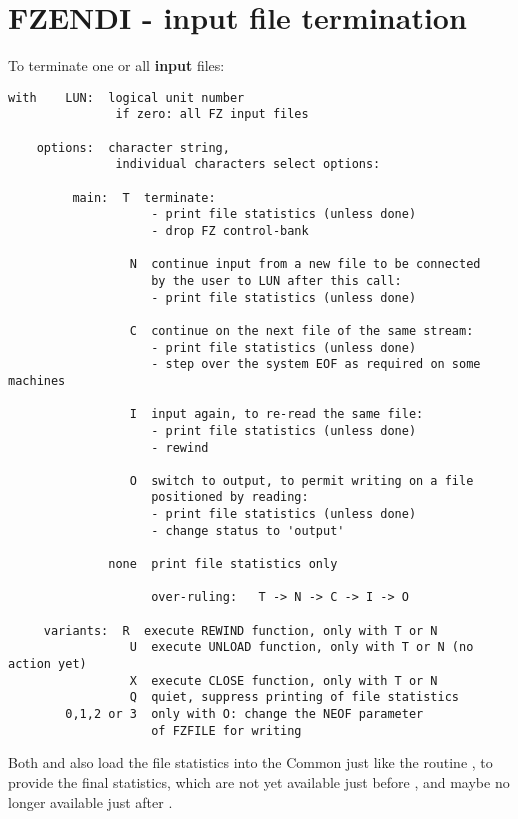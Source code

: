 \section{FZENDI - input file termination}

To terminate one or all \textbf{input} files:


\begin{verbatim}
with    LUN:  logical unit number
               if zero: all FZ input files

    options:  character string,
               individual characters select options:

         main:  T  terminate:
                    - print file statistics (unless done)
                    - drop FZ control-bank

                 N  continue input from a new file to be connected
                    by the user to LUN after this call:
                    - print file statistics (unless done)

                 C  continue on the next file of the same stream:
                    - print file statistics (unless done)
                    - step over the system EOF as required on some machines

                 I  input again, to re-read the same file:
                    - print file statistics (unless done)
                    - rewind

                 O  switch to output, to permit writing on a file
                    positioned by reading:
                    - print file statistics (unless done)
                    - change status to 'output'

              none  print file statistics only

                    over-ruling:   T -> N -> C -> I -> O

     variants:  R  execute REWIND function, only with T or N
                 U  execute UNLOAD function, only with T or N (no action yet)
                 X  execute CLOSE function, only with T or N
                 Q  quiet, suppress printing of file statistics
        0,1,2 or 3  only with O: change the NEOF parameter
                    of FZFILE for writing
\end{verbatim}

Both  and  also load the file statistics
into the Common  just like the routine ,
to provide the final statistics,
which are not yet available just before ,
and maybe no longer available just after .

